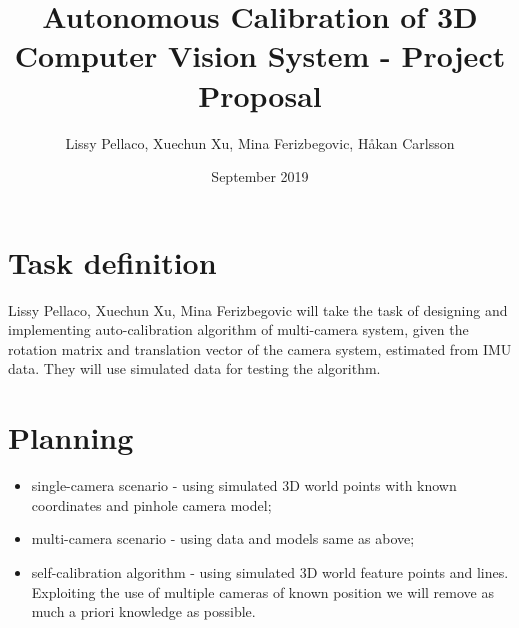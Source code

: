 \documentclass[12pt]{extarticle}
\title{Autonomous Calibration of 3D Computer Vision System - Project Proposal}
\author{Lissy Pellaco, Xuechun Xu, Mina Ferizbegovic, Håkan Carlsson}
\date{September 2019}
\begin{document}
\maketitle

\section{Task definition}
Lissy Pellaco, Xuechun Xu, Mina Ferizbegovic will take the task of designing and implementing auto-calibration algorithm of multi-camera system, given the rotation matrix and translation vector of the camera system, estimated from IMU data. They will use simulated data for testing the algorithm.
 
\section{Planning}
\begin{itemize}
\item single-camera scenario - using simulated 3D world points with known coordinates and pinhole camera model;
\item multi-camera scenario - using data and models same as above;
\item self-calibration algorithm -  using simulated 3D world feature points and lines. Exploiting the use of multiple cameras of known position we will remove as much a priori knowledge as possible.
\end{itemize}
\end{document}
